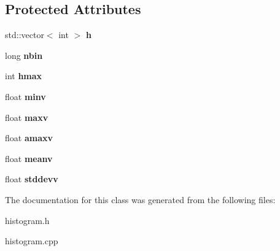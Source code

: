 \subsection*{Protected Attributes}
\begin{DoxyCompactItemize}
\item 
\hypertarget{classHistogram_ab68dda8c125f1c4803d557f7b03eb102}{
std::vector$<$ int $>$ {\bfseries h}}
\label{classHistogram_ab68dda8c125f1c4803d557f7b03eb102}

\item 
\hypertarget{classHistogram_a78232d45b5d3896463abb52682f502c3}{
long {\bfseries nbin}}
\label{classHistogram_a78232d45b5d3896463abb52682f502c3}

\item 
\hypertarget{classHistogram_a6439e01169ef5374dee9438d7718a22f}{
int {\bfseries hmax}}
\label{classHistogram_a6439e01169ef5374dee9438d7718a22f}

\item 
\hypertarget{classHistogram_a7a87e68ac0e69e25caf2827c7f236a48}{
float {\bfseries minv}}
\label{classHistogram_a7a87e68ac0e69e25caf2827c7f236a48}

\item 
\hypertarget{classHistogram_ae8eac244222f0c6e51ffc4fc77467e72}{
float {\bfseries maxv}}
\label{classHistogram_ae8eac244222f0c6e51ffc4fc77467e72}

\item 
\hypertarget{classHistogram_af9b4005cd40f8d6d6dd0f8857b6a49b7}{
float {\bfseries amaxv}}
\label{classHistogram_af9b4005cd40f8d6d6dd0f8857b6a49b7}

\item 
\hypertarget{classHistogram_a32f51ad1be0e940f189d30aabc029b59}{
float {\bfseries meanv}}
\label{classHistogram_a32f51ad1be0e940f189d30aabc029b59}

\item 
\hypertarget{classHistogram_a96ab7a6ac3fed525eaad84e88cc5ef00}{
float {\bfseries stddevv}}
\label{classHistogram_a96ab7a6ac3fed525eaad84e88cc5ef00}

\end{DoxyCompactItemize}


The documentation for this class was generated from the following files:\begin{DoxyCompactItemize}
\item 
histogram.h\item 
histogram.cpp\end{DoxyCompactItemize}
